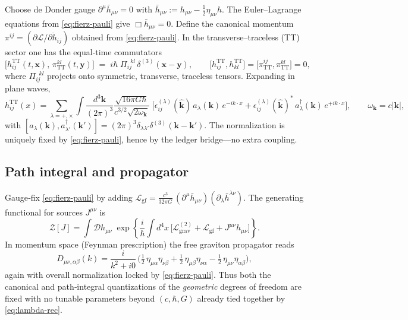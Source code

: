 \documentclass[11pt]{article}
\begin{document}
Choose de Donder gauge $\partial^\mu\bar h_{\mu\nu}=0$ with $\bar h_{\mu\nu}:=h_{\mu\nu}-\tfrac12\eta_{\mu\nu}h$. The Euler–Lagrange equations from \eqref{eq:fierz-pauli} give $\Box \bar h_{\mu\nu}=0$. Define the canonical momentum $\pi^{ij}=(\partial\mathcal{L}/\partial \dot h_{ij})$ obtained from \eqref{eq:fierz-pauli}. In the transverse–traceless (TT) sector one has the equal‑time commutators
\begin{equation}
\big[h_{ij}^{\mathrm{TT}}(t,\mathbf{x}),\,\pi^{kl}_{\mathrm{TT}}(t,\mathbf{y})\big]
\;=\;
i\hbar\;\Pi_{ij}^{\;\;kl}\,\delta^{(3)}(\mathbf{x}-\mathbf{y}),
\qquad
\big[h_{ij}^{\mathrm{TT}},h_{kl}^{\mathrm{TT}}\big]=\big[\pi^{ij}_{\mathrm{TT}},\pi^{kl}_{\mathrm{TT}}\big]=0,
\label{eq:comm}
\end{equation}
where $\Pi_{ij}^{\;\;kl}$ projects onto symmetric, transverse, traceless tensors. Expanding in plane waves,
\begin{equation}
h_{ij}^{\mathrm{TT}}(x)
=
\sum_{\lambda=+,\times}\!\int\!\frac{d^3\mathbf{k}}{(2\pi)^3}
\frac{\sqrt{16\pi G\hbar}}{c^{3/2}\sqrt{2\omega_{\mathbf{k}}}}\;
\Big[
\epsilon^{(\lambda)}_{ij}(\hat{\mathbf{k}})\,a_{\lambda}(\mathbf{k})\,e^{-ik\cdot x}
+\epsilon^{(\lambda)}_{ij}(\hat{\mathbf{k}})^{\!*}\,a_{\lambda}^\dagger(\mathbf{k})\,e^{+ik\cdot x}
\Big],
\qquad \omega_{\mathbf{k}}=c|\mathbf{k}|,
\label{eq:modeexp}
\end{equation}
with $[a_\lambda(\mathbf{k}),a_{\lambda'}^\dagger(\mathbf{k}')]=(2\pi)^3\delta_{\lambda\lambda'}\delta^{(3)}(\mathbf{k}-\mathbf{k}')$. The normalization is uniquely fixed by \eqref{eq:fierz-pauli}, hence by the ledger bridge—no extra coupling.

\subsection*{Path integral and propagator}

Gauge‑fix \eqref{eq:fierz-pauli} by adding $\mathcal{L}_{\mathrm{gf}}=\tfrac{c^3}{32\pi G}\,(\partial^\mu\bar h_{\mu\nu})(\partial_\lambda \bar h^{\lambda\nu})$. The generating functional for sources $J^{\mu\nu}$ is
\begin{equation}
\mathcal{Z}[J]
=
\int \mathcal{D}h_{\mu\nu}\;
\exp\!\left\{\frac{i}{\hbar}\!\int\! d^4x\,
\Big[\mathcal{L}_{\mathrm{grav}}^{(2)}+\mathcal{L}_{\mathrm{gf}}
+ J^{\mu\nu}h_{\mu\nu}\Big]\right\}.
\label{eq:ZJ}
\end{equation}
In momentum space (Feynman prescription) the free graviton propagator reads
\begin{equation}
D_{\mu\nu,\alpha\beta}(k)
=
\frac{i}{k^2+i0}\,
\Big(\tfrac12\,\eta_{\mu\alpha}\eta_{\nu\beta}
+\tfrac12\,\eta_{\mu\beta}\eta_{\nu\alpha}
-\tfrac12\,\eta_{\mu\nu}\eta_{\alpha\beta}\Big),
\label{eq:propagator}
\end{equation}
again with overall normalization locked by \eqref{eq:fierz-pauli}. Thus both the canonical and path‑integral quantizations of the \emph{geometric} degrees of freedom are fixed with no tunable parameters beyond $(c,\hbar,G)$ already tied together by \eqref{eq:lambda-rec}.
\end{document}

